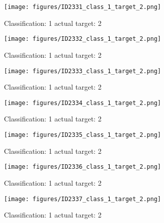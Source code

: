 \begin{figure}[h!]
\begin{center}
\texttt{[image: figures/ID2331\_class\_1\_target\_2.png]}
\end{center}
\caption{ Classification: 1 actual target: 2}
\label{fig:ID2331_class_1_target_2}
\end{figure}
\begin{figure}[h!]
\begin{center}
\texttt{[image: figures/ID2332\_class\_1\_target\_2.png]}
\end{center}
\caption{ Classification: 1 actual target: 2}
\label{fig:ID2332_class_1_target_2}
\end{figure}
\begin{figure}[h!]
\begin{center}
\texttt{[image: figures/ID2333\_class\_1\_target\_2.png]}
\end{center}
\caption{ Classification: 1 actual target: 2}
\label{fig:ID2333_class_1_target_2}
\end{figure}
\begin{figure}[h!]
\begin{center}
\texttt{[image: figures/ID2334\_class\_1\_target\_2.png]}
\end{center}
\caption{ Classification: 1 actual target: 2}
\label{fig:ID2334_class_1_target_2}
\end{figure}
\begin{figure}[h!]
\begin{center}
\texttt{[image: figures/ID2335\_class\_1\_target\_2.png]}
\end{center}
\caption{ Classification: 1 actual target: 2}
\label{fig:ID2335_class_1_target_2}
\end{figure}
\begin{figure}[h!]
\begin{center}
\texttt{[image: figures/ID2336\_class\_1\_target\_2.png]}
\end{center}
\caption{ Classification: 1 actual target: 2}
\label{fig:ID2336_class_1_target_2}
\end{figure}
\begin{figure}[h!]
\begin{center}
\texttt{[image: figures/ID2337\_class\_1\_target\_2.png]}
\end{center}
\caption{ Classification: 1 actual target: 2}
\label{fig:ID2337_class_1_target_2}
\end{figure}
